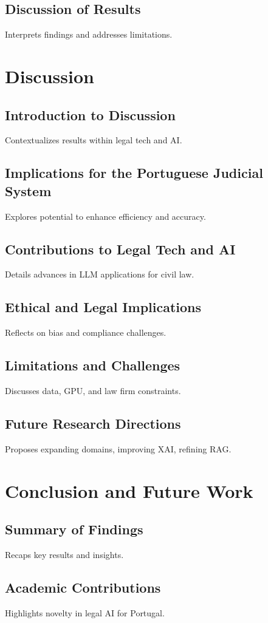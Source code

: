 \documentclass[11pt,a4paper,twoside,openright]{book}
\begin{document}
\section{Discussion of Results}
Interprets findings and addresses limitations.

\chapter{Discussion}
\section{Introduction to Discussion}
Contextualizes results within legal tech and AI.
\section{Implications for the Portuguese Judicial System}
Explores potential to enhance efficiency and accuracy.
\section{Contributions to Legal Tech and AI}
Details advances in LLM applications for civil law.
\section{Ethical and Legal Implications}
Reflects on bias and compliance challenges.
\section{Limitations and Challenges}
Discusses data, GPU, and law firm constraints.
\section{Future Research Directions}
Proposes expanding domains, improving XAI, refining RAG.

\chapter{Conclusion and Future Work}
\section{Summary of Findings}
Recaps key results and insights.
\section{Academic Contributions}
Highlights novelty in legal AI for Portugal.
\end{document}
